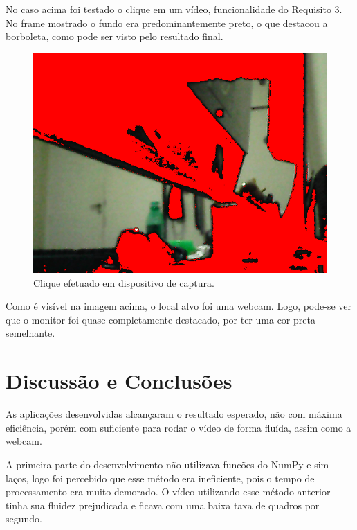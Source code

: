\documentclass{bmvc2k}
\begin{document}
No caso acima foi testado o clique em um vídeo, funcionalidade do Requisito 3. No frame mostrado o fundo 
era predominantemente preto, o que destacou a borboleta, como pode ser visto 
pelo resultado final.


\begin{figure}[h]
    \centering
    \includegraphics[scale=0.4]{Figs/r41.png}
    \vspace*{-2mm}\caption{Clique efetuado em dispositivo de captura.}
    \vspace{0.1cm}
\end{figure}

Como é visível na imagem acima, o local alvo foi uma webcam. Logo, pode-se ver que o monitor
foi quase completamente destacado, por ter uma cor preta semelhante.

\section{Discussão e Conclusões}

As aplicações desenvolvidas alcançaram o resultado esperado, não com máxima eficiência, porém com
suficiente para rodar o vídeo de forma fluída, assim como a webcam. 

A primeira parte do desenvolvimento não utilizava funcões do NumPy \cite{scipy} e sim laços, logo 
foi percebido que esse método era ineficiente, pois o tempo de processamento era muito
demorado. O vídeo utilizando esse método anterior tinha sua fluidez prejudicada e
ficava com uma baixa taxa de quadros por segundo.
\end{document}
